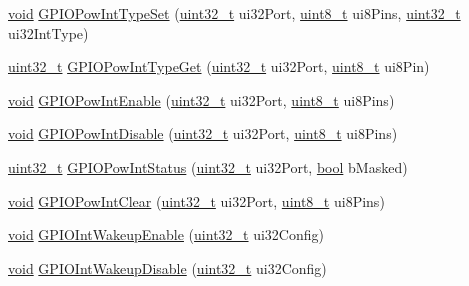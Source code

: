 \begin{DoxyCompactItemize}
\item 
\hyperlink{usb__devapi_8h_afabf60e7f57651d6d595a02c75f07cd0}{void} \hyperlink{group__gpio__api_gadf6a7664e1f109e2606e06d8651acfa3}{G\+P\+I\+O\+Pow\+Int\+Type\+Set} (\hyperlink{_p_e___types_8h_a33594304e786b158f3fb30289278f5af}{uint32\+\_\+t} ui32\+Port, \hyperlink{_p_e___types_8h_aba7bc1797add20fe3efdf37ced1182c5}{uint8\+\_\+t} ui8\+Pins, \hyperlink{_p_e___types_8h_a33594304e786b158f3fb30289278f5af}{uint32\+\_\+t} ui32\+Int\+Type)
\item 
\hyperlink{_p_e___types_8h_a33594304e786b158f3fb30289278f5af}{uint32\+\_\+t} \hyperlink{group__gpio__api_ga7c3716ecbe1843e670936a2abfd63398}{G\+P\+I\+O\+Pow\+Int\+Type\+Get} (\hyperlink{_p_e___types_8h_a33594304e786b158f3fb30289278f5af}{uint32\+\_\+t} ui32\+Port, \hyperlink{_p_e___types_8h_aba7bc1797add20fe3efdf37ced1182c5}{uint8\+\_\+t} ui8\+Pin)
\item 
\hyperlink{usb__devapi_8h_afabf60e7f57651d6d595a02c75f07cd0}{void} \hyperlink{group__gpio__api_ga3e72dadb25c421d27e4346e96a8014e1}{G\+P\+I\+O\+Pow\+Int\+Enable} (\hyperlink{_p_e___types_8h_a33594304e786b158f3fb30289278f5af}{uint32\+\_\+t} ui32\+Port, \hyperlink{_p_e___types_8h_aba7bc1797add20fe3efdf37ced1182c5}{uint8\+\_\+t} ui8\+Pins)
\item 
\hyperlink{usb__devapi_8h_afabf60e7f57651d6d595a02c75f07cd0}{void} \hyperlink{group__gpio__api_gaa224fc9fa3565a968bdd49cdaa42cc80}{G\+P\+I\+O\+Pow\+Int\+Disable} (\hyperlink{_p_e___types_8h_a33594304e786b158f3fb30289278f5af}{uint32\+\_\+t} ui32\+Port, \hyperlink{_p_e___types_8h_aba7bc1797add20fe3efdf37ced1182c5}{uint8\+\_\+t} ui8\+Pins)
\item 
\hyperlink{_p_e___types_8h_a33594304e786b158f3fb30289278f5af}{uint32\+\_\+t} \hyperlink{group__gpio__api_gadadc7070b1732d344b2890b0d4a45681}{G\+P\+I\+O\+Pow\+Int\+Status} (\hyperlink{_p_e___types_8h_a33594304e786b158f3fb30289278f5af}{uint32\+\_\+t} ui32\+Port, \hyperlink{_p_e___types_8h_a97a80ca1602ebf2303258971a2c938e2}{bool} b\+Masked)
\item 
\hyperlink{usb__devapi_8h_afabf60e7f57651d6d595a02c75f07cd0}{void} \hyperlink{group__gpio__api_ga5ab6595763c4d040bff3862784dfb77b}{G\+P\+I\+O\+Pow\+Int\+Clear} (\hyperlink{_p_e___types_8h_a33594304e786b158f3fb30289278f5af}{uint32\+\_\+t} ui32\+Port, \hyperlink{_p_e___types_8h_aba7bc1797add20fe3efdf37ced1182c5}{uint8\+\_\+t} ui8\+Pins)
\item 
\hyperlink{usb__devapi_8h_afabf60e7f57651d6d595a02c75f07cd0}{void} \hyperlink{group__gpio__api_gaee8e2084b5316d970d4bc479c3ae7934}{G\+P\+I\+O\+Int\+Wakeup\+Enable} (\hyperlink{_p_e___types_8h_a33594304e786b158f3fb30289278f5af}{uint32\+\_\+t} ui32\+Config)
\item 
\hyperlink{usb__devapi_8h_afabf60e7f57651d6d595a02c75f07cd0}{void} \hyperlink{group__gpio__api_gaacc37245da8b1a7c75211927eb8d513a}{G\+P\+I\+O\+Int\+Wakeup\+Disable} (\hyperlink{_p_e___types_8h_a33594304e786b158f3fb30289278f5af}{uint32\+\_\+t} ui32\+Config)
\end{DoxyCompactItemize}
